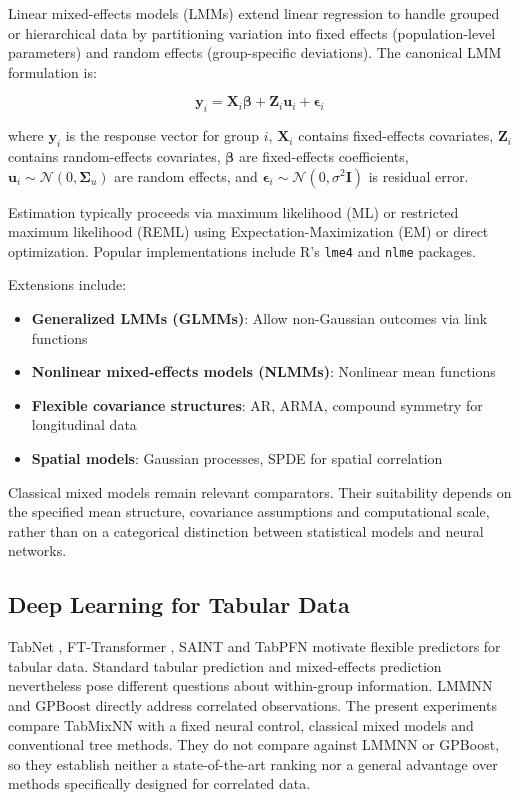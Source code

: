 \documentclass[12pt,a4paper]{article}
\newcommand{\N}{\mathcal{N}}
\newcommand{\bX}{\mathbf{X}}
\newcommand{\bZ}{\mathbf{Z}}
\newcommand{\by}{\mathbf{y}}
\newcommand{\bU}{\mathbf{u}}
\newcommand{\bbeta}{\boldsymbol{\beta}}
\newcommand{\bSigma}{\boldsymbol{\Sigma}}
\begin{document}
Linear mixed-effects models (LMMs) extend linear regression to handle grouped or hierarchical data by partitioning variation into fixed effects (population-level parameters) and random effects (group-specific deviations). The canonical LMM formulation is:

\begin{equation}
    \by_i = \bX_i\bbeta + \bZ_i\bU_i + \boldsymbol{\epsilon}_i
\end{equation}

where $\by_i$ is the response vector for group $i$, $\bX_i$ contains fixed-effects covariates, $\bZ_i$ contains random-effects covariates, $\bbeta$ are fixed-effects coefficients, $\bU_i \sim \N(0, \bSigma_u)$ are random effects, and $\boldsymbol{\epsilon}_i \sim \N(0, \sigma^2\mathbf{I})$ is residual error.

Estimation typically proceeds via maximum likelihood (ML) or restricted maximum likelihood (REML) using Expectation-Maximization (EM) or direct optimization. Popular implementations include R's \texttt{lme4} \citep{bates2014fitting} and \texttt{nlme} \citep{pinheiro2006mixed} packages.

Extensions include:
\begin{itemize}
    \item \textbf{Generalized LMMs (GLMMs)}: Allow non-Gaussian outcomes via link functions \citep{mcculloch2001generalized}
    \item \textbf{Nonlinear mixed-effects models (NLMMs)}: Nonlinear mean functions \citep{lindstrom1990nonlinear}
    \item \textbf{Flexible covariance structures}: AR, ARMA, compound symmetry for longitudinal data
    \item \textbf{Spatial models}: Gaussian processes, SPDE for spatial correlation \citep{lindgren2011explicit}
\end{itemize}

Classical mixed models remain relevant comparators. Their suitability depends on the specified mean structure, covariance assumptions and computational scale, rather than on a categorical distinction between statistical models and neural networks.

\subsection{Deep Learning for Tabular Data}

TabNet \citep{arik2021tabnet}, FT-Transformer \citep{gorishniy2021revisiting}, SAINT \citep{somepalli2021saint} and TabPFN \citep{hollmann2023tabpfn} motivate flexible predictors for tabular data. Standard tabular prediction and mixed-effects prediction nevertheless pose different questions about within-group information. LMMNN \citep{simchoni2023integrating} and GPBoost \citep{sigrist2022gaussian} directly address correlated observations. The present experiments compare TabMixNN with a fixed neural control, classical mixed models and conventional tree methods. They do not compare against LMMNN or GPBoost, so they establish neither a state-of-the-art ranking nor a general advantage over methods specifically designed for correlated data.
\end{document}
